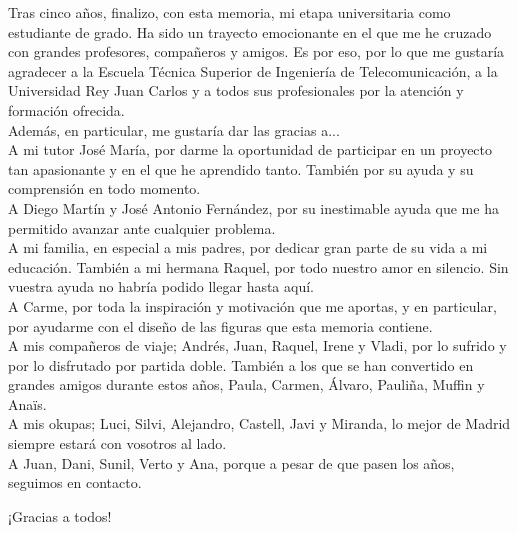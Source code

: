
Tras cinco años, finalizo, con esta memoria, mi etapa universitaria como estudiante de grado. Ha sido un trayecto emocionante en el que me he cruzado con grandes profesores, compañeros y amigos. %
Es por eso, por lo que me gustaría agradecer a la Escuela Técnica Superior de Ingeniería de Telecomunicación, a la Universidad Rey Juan Carlos y a todos sus profesionales por la atención y formación ofrecida. \\
Además, en particular, me gustaría dar las gracias a... \\


A mi tutor José María, por darme la oportunidad de participar en un proyecto tan apasionante y en el que he aprendido tanto. También por su ayuda y su comprensión en todo momento. \\

A Diego Martín y José Antonio Fernández, por su inestimable ayuda que me ha permitido avanzar ante cualquier problema. \\

A mi familia, en especial a mis padres, por dedicar gran parte de su vida a mi educación. También a mi hermana Raquel, por todo nuestro amor en silencio. Sin vuestra ayuda no habría podido llegar hasta aquí. \\

A Carme, por toda la inspiración y motivación que me aportas, y en particular, por ayudarme con el diseño de las figuras que esta memoria contiene. \\

A mis compañeros de viaje; Andrés, Juan, Raquel, Irene y Vladi, por lo sufrido y por lo disfrutado por partida doble. También a los que se han convertido en grandes amigos durante estos años, Paula, Carmen, Álvaro, Pauliña, Muffin y Anaïs. \\

A mis okupas; Luci, Silvi, Alejandro, Castell, Javi y Miranda, lo mejor de Madrid siempre estará con vosotros al lado. \\

A Juan, Dani, Sunil, Verto y Ana, porque a pesar de que pasen los años, seguimos en contacto. \\

\begin{center}
    ¡Gracias a todos!
\end{center}